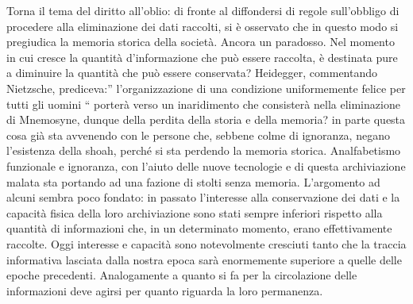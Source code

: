 Torna il tema del diritto all’oblio: di fronte al diffondersi di regole sull’obbligo di procedere alla eliminazione dei dati raccolti, si è osservato che in questo modo si pregiudica la memoria storica della società. Ancora un paradosso. Nel momento in cui cresce la quantità d’informazione che può essere raccolta, è destinata pure a diminuire la quantità che può essere conservata? Heidegger, commentando Nietzsche, prediceva:” l’organizzazione di una condizione uniformemente felice per tutti gli uomini “ porterà verso un inaridimento che consisterà nella eliminazione di Mnemosyne, dunque della perdita della storia e della memoria? in parte questa cosa già sta avvenendo con le persone che, sebbene colme di ignoranza, negano l’esistenza della shoah, perché si sta perdendo la memoria storica. Analfabetismo funzionale e ignoranza, con l’aiuto delle nuove tecnologie e di questa archiviazione malata sta portando ad una fazione di stolti senza memoria.
L’argomento ad alcuni sembra poco fondato: in passato l’interesse alla conservazione dei dati e la capacità fisica della loro archiviazione sono stati sempre inferiori rispetto alla quantità di informazioni che, in un determinato momento, erano effettivamente raccolte. Oggi interesse e capacità sono notevolmente cresciuti tanto che la traccia informativa lasciata dalla nostra epoca sarà enormemente superiore a quelle delle epoche precedenti.
Analogamente a quanto si fa per la circolazione delle informazioni deve agirsi per quanto riguarda la loro permanenza.

